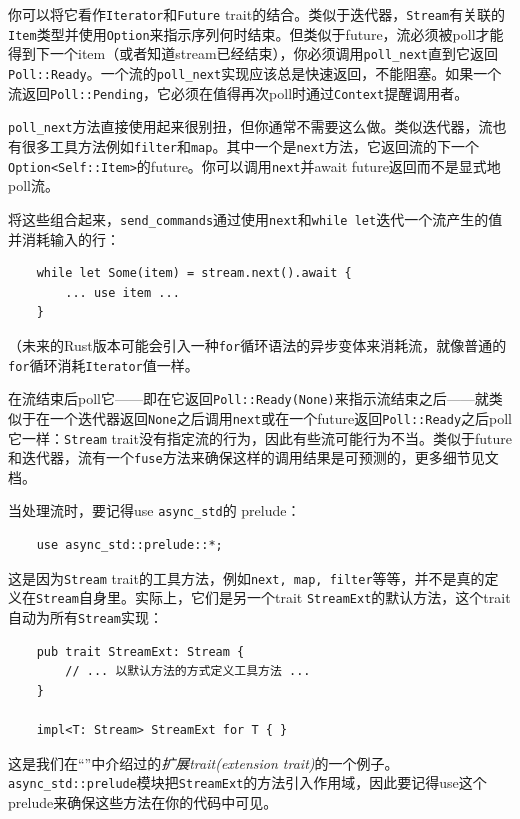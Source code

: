 你可以将它看作\texttt{Iterator}和\texttt{Future} trait的结合。类似于迭代器，\texttt{Stream}有关联的\texttt{Item}类型并使用\texttt{Option}来指示序列何时结束。但类似于future，流必须被poll才能得到下一个item（或者知道stream已经结束），你必须调用\texttt{poll\_next}直到它返回\texttt{Poll::Ready}。一个流的\texttt{poll\_next}实现应该总是快速返回，不能阻塞。如果一个流返回\texttt{Poll::Pending}，它必须在值得再次poll时通过\texttt{Context}提醒调用者。

\texttt{poll\_next}方法直接使用起来很别扭，但你通常不需要这么做。类似迭代器，流也有很多工具方法例如\texttt{filter}和\texttt{map}。其中一个是\texttt{next}方法，它返回流的下一个\texttt{Option<Self::Item>}的future。你可以调用\texttt{next}并await future返回而不是显式地poll流。

将这些组合起来，\texttt{send\_commands}通过使用\texttt{next}和\texttt{while let}迭代一个流产生的值并消耗输入的行：
\begin{verbatim}
    while let Some(item) = stream.next().await {
        ... use item ...
    }
\end{verbatim}

（未来的Rust版本可能会引入一种\texttt{for}循环语法的异步变体来消耗流，就像普通的\texttt{for}循环消耗\texttt{Iterator}值一样。

在流结束后poll它——即在它返回\texttt{Poll::Ready(None)}来指示流结束之后——就类似于在一个迭代器返回\texttt{None}之后调用\texttt{next}或在一个future返回\texttt{Poll::Ready}之后poll它一样：\texttt{Stream} trait没有指定流的行为，因此有些流可能行为不当。类似于future和迭代器，流有一个\texttt{fuse}方法来确保这样的调用结果是可预测的，更多细节见文档。

当处理流时，要记得use \texttt{async\_std}的 prelude：
\begin{verbatim}
    use async_std::prelude::*;
\end{verbatim}

这是因为\texttt{Stream} trait的工具方法，例如\texttt{next, map, filter}等等，并不是真的定义在\texttt{Stream}自身里。实际上，它们是另一个trait \texttt{StreamExt}的默认方法，这个trait自动为所有\texttt{Stream}实现：
\begin{verbatim}
    pub trait StreamExt: Stream {
        // ... 以默认方法的方式定义工具方法 ...
    }

    impl<T: Stream> StreamExt for T { }
\end{verbatim}

这是我们在“”中介绍过的\emph{扩展trait(extension trait)}的一个例子。\texttt{async\_std::prelude}模块把\texttt{StreamExt}的方法引入作用域，因此要记得use这个prelude来确保这些方法在你的代码中可见。

